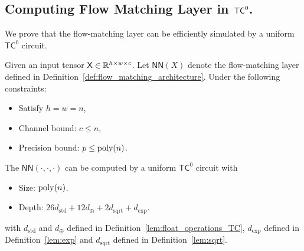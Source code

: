 \subsection{Computing Flow Matching Layer in \texorpdfstring{$\mathsf{TC}^0$}{}.}\label{sec:fl_tc0}
We prove that the flow-matching layer can be efficiently simulated by a uniform $\mathsf{TC}^0$ circuit.
\begin{lemma}\label{lem:fm_tc0}
     Given an input tensor $\mathsf{X} \in \mathbb{R}^{h \times w \times c}$. Let $\mathsf{NN}(X)$ denote the flow-matching layer defined in Definition~\ref{def:flow_matching_architecture}. Under the following constraints:
     \begin{itemize}
         \item Satisfy $h = w = n$,
         \item Channel bound: $c \leq n$,
         \item Precision bound: $p \leq \operatorname{poly}(n)$.
     \end{itemize}
     The $\mathsf{NN}(\cdot, \cdot,\cdot)$ can be computed by a uniform $\mathsf{TC}^0$ circuit with
     \begin{itemize}
        \item Size: $\operatorname{poly}(n)$.
        \item Depth: $26d_{\mathrm{std}}+ 12 d_{\oplus} + 2d_{\mathrm{sqrt}} + d_{\exp}$.
     \end{itemize} 
    with $d_{\mathrm{std}}$ and $d_{\oplus}$ defined in Definition~\ref{lem:float_operations_TC}, $d_{\exp}$ defined in Definition~\ref{lem:exp} and $d_{\mathrm{sqrt}}$ defined in Definition~\ref{lem:sqrt}.
\end{lemma}

